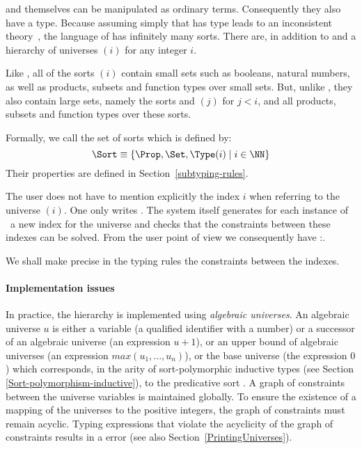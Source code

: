{\Prop} and {\Set} themselves can be manipulated as ordinary
terms. Consequently they also have a type. Because assuming simply
that {\Set} has type {\Set} leads to an inconsistent theory~\cite{Coq86}, the
language of {\CIC} has infinitely many sorts. There are, in addition
to {\Set} and {\Prop} a hierarchy of universes {\Type$(i)$} for any
integer $i$.

Like {\Set}, all of the sorts {\Type$(i)$} contain small sets such as
booleans, natural numbers, as well as products, subsets and function
types over small sets. But, unlike {\Set}, they also contain large
sets, namely the sorts {\Set} and {\Type$(j)$} for $j<i$, and all
products, subsets and function types over these sorts.

Formally, we call {\Sort} the set of sorts which is defined by:
%
%
%
\[\Sort \equiv \{\Prop,\Set,\Type(i)\;|\; i \in \NN\} \]
Their properties are defined in Section~\ref{subtyping-rules}.


The user does not have to mention explicitly the index $i$ when referring to
the universe \Type$(i)$. One only writes \Type. The
system itself generates for each instance of \Type\ a new
index for the universe and checks that the constraints between these
indexes can be solved. From the user point of view we consequently
have {\Type}:{\Type}.

We shall make precise in the typing rules the constraints between the
indexes. 

\paragraph{Implementation issues}
In practice, the {\Type} hierarchy is implemented using
{\em algebraic universes}.
An algebraic universe $u$ is either a variable (a qualified
identifier with a number) or a successor of an algebraic universe (an
expression $u+1$), or an upper bound of algebraic universes (an
expression $max(u_1,...,u_n)$), or the base universe (the expression
$0$) which corresponds, in the arity of sort-polymorphic inductive
types (see Section \ref{Sort-polymorphism-inductive}),
to the predicative sort {\Set}. A graph of constraints between
the universe variables is maintained globally. To ensure the existence
of a mapping of the universes to the positive integers, the graph of
constraints must remain acyclic.  Typing expressions that violate the
acyclicity of the graph of constraints results in a  error (see also Section~\ref{PrintingUniverses}).

